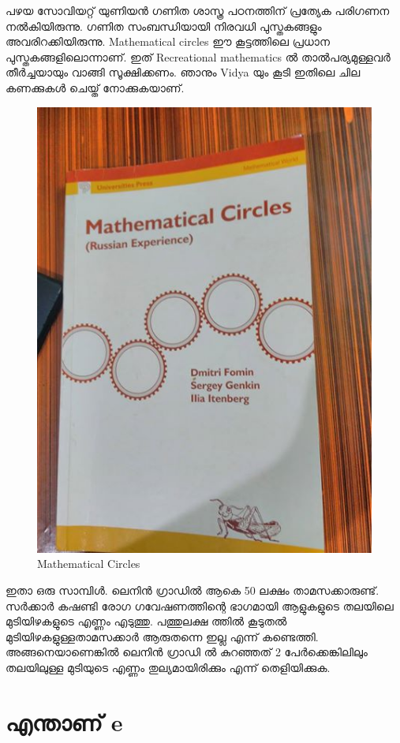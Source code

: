 \documentclass[10pt,a4paper]{report}
\begin{document}
  പഴയ സോവിയറ്റ് യുണിയൻ ഗണിത ശാസ്ത്ര പഠനത്തിന് പ്രത്യേക പരിഗണന നൽകിയിരുന്നു. ഗണിത സംബന്ധിയായി നിരവധി പുസ്തകങ്ങളും അവരിറക്കിയിരുന്നു. Mathematical circles ഈ കൂട്ടത്തിലെ പ്രധാന പുസ്തകങ്ങളിലൊന്നാണ്. ഇത് Recreational mathematics ൽ താൽപര്യമുള്ളവർ തീർച്ചയായും വാങ്ങി സൂക്ഷിക്കണം. ഞാനും Vidya യും കൂടി ഇതിലെ ചില കണക്കുകൾ ചെയ്ത് നോക്കുകയാണ്.
  
  \begin{figure}[H]
  \center
\includegraphics[scale=.25]{images/lenin}
\caption{Mathematical Circles}  
\label{lenin}
\end{figure}
ഇതാ ഒരു സാമ്പിൾ.
ലെനിൻ ഗ്രാഡിൽ ആകെ 50 ലക്ഷം താമസക്കാരുണ്ട്. സർക്കാർ കഷണ്ടി രോഗ ഗവേഷണത്തിന്റെ ഭാഗമായി ആളുകളുടെ തലയിലെ മുടിയിഴകളുടെ എണ്ണം എടുത്തു. പത്തുലക്ഷ ത്തിൽ കൂടുതൽ മുടിയിഴകളുള്ളതാമസക്കാർ ആരുതന്നെ ഇല്ല എന്ന് കണ്ടെത്തി. അങ്ങനെയാണെങ്കിൽ ലെനിൻ ഗ്രാഡി ൽ കുറഞ്ഞത് 2 പേർക്കെങ്കിലിലും തലയിലുള്ള മുടിയുടെ എണ്ണം തുല്യമായിരിക്കും എന്ന് തെളിയിക്കുക.


  \section{എന്താണ് e}
\end{document}
